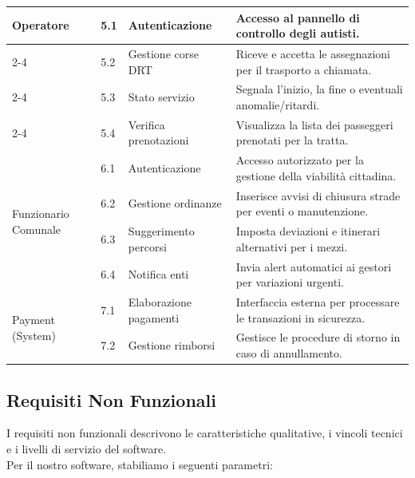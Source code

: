 \begin{table}[H]
\begin{tabularx}{\textwidth}{|l|l|X|X|}
\multirow{4}{*}{Operatore} & 5.1 & Autenticazione & Accesso al pannello di controllo degli autisti. \\ \cline{2-4} 
 & 5.2 & Gestione corse DRT & Riceve e accetta le assegnazioni per il trasporto a chiamata. \\ \cline{2-4} 
 & 5.3 & Stato servizio & Segnala l'inizio, la fine o eventuali anomalie/ritardi. \\ \cline{2-4} 
 & 5.4 & Verifica prenotazioni & Visualizza la lista dei passeggeri prenotati per la tratta. \\ \hline

\multirow{4}{*}{Funzionario Comunale} & 6.1 & Autenticazione & Accesso autorizzato per la gestione della viabilità cittadina. \\ \cline{2-4} 
 & 6.2 & Gestione ordinanze & Inserisce avvisi di chiusura strade per eventi o manutenzione. \\ \cline{2-4} 
 & 6.3 & Suggerimento percorsi & Imposta deviazioni e itinerari alternativi per i mezzi. \\ \cline{2-4} 
 & 6.4 & Notifica enti & Invia alert automatici ai gestori per variazioni urgenti. \\ \hline

\multirow{2}{*}{Payment (System)} & 7.1 & Elaborazione pagamenti & Interfaccia esterna per processare le transazioni in sicurezza. \\ \cline{2-4} 
 & 7.2 & Gestione rimborsi & Gestisce le procedure di storno in caso di annullamento. \\ \hline

\end{tabularx}
\end{table}
\newpage

\subsection*{Requisiti Non Funzionali}
I requisiti non funzionali descrivono le caratteristiche qualitative, i vincoli tecnici e i livelli di servizio del software. 
\\
Per il nostro software, stabiliamo i seguenti parametri:

